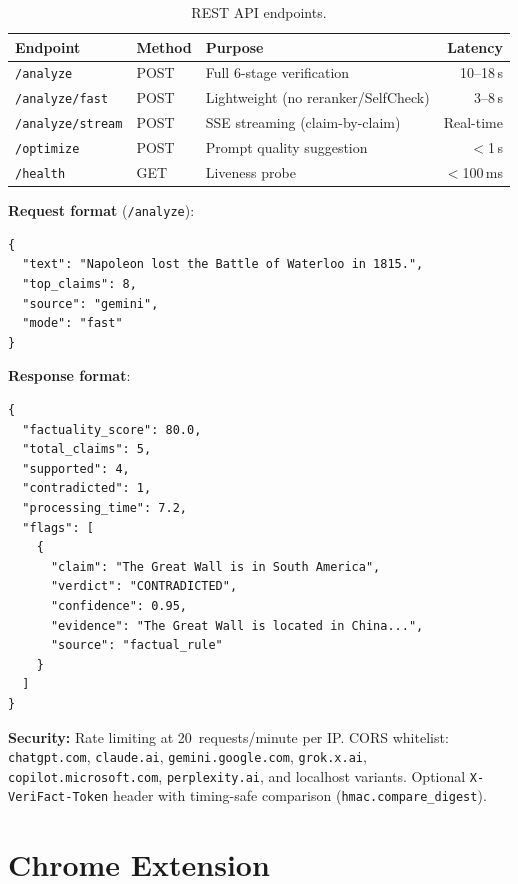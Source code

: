 \documentclass[12pt, a4paper, oneside]{report}
\begin{document}
\begin{table}[H]
\centering
\caption{REST API endpoints.}
\label{tab:api}
\small
\begin{tabularx}{\textwidth}{l l X r}
\toprule
\textbf{Endpoint} & \textbf{Method} & \textbf{Purpose} & \textbf{Latency} \\
\midrule
\texttt{/analyze} & POST & Full 6-stage verification & 10--18\,s \\
\texttt{/analyze/fast} & POST & Lightweight (no reranker/SelfCheck) & 3--8\,s \\
\texttt{/analyze/stream} & POST & SSE streaming (claim-by-claim) & Real-time \\
\texttt{/optimize} & POST & Prompt quality suggestion & $<$1\,s \\
\texttt{/health} & GET & Liveness probe & $<$100\,ms \\
\bottomrule
\end{tabularx}
\end{table}

\textbf{Request format} (\texttt{/analyze}):
\begin{lstlisting}[style=jsonstyle, caption={POST /analyze request body.}]
{
  "text": "Napoleon lost the Battle of Waterloo in 1815.",
  "top_claims": 8,
  "source": "gemini",
  "mode": "fast"
}
\end{lstlisting}

\textbf{Response format}:
\begin{lstlisting}[style=jsonstyle, caption={POST /analyze response body.}]
{
  "factuality_score": 80.0,
  "total_claims": 5,
  "supported": 4,
  "contradicted": 1,
  "processing_time": 7.2,
  "flags": [
    {
      "claim": "The Great Wall is in South America",
      "verdict": "CONTRADICTED",
      "confidence": 0.95,
      "evidence": "The Great Wall is located in China...",
      "source": "factual_rule"
    }
  ]
}
\end{lstlisting}

\textbf{Security:} Rate limiting at 20~requests/minute per IP. CORS whitelist: \texttt{chatgpt.com}, \texttt{claude.ai}, \texttt{gemini.google.com}, \texttt{grok.x.ai}, \texttt{copilot.microsoft.com}, \texttt{perplexity.ai}, and localhost variants. Optional \texttt{X-VeriFact-Token} header with timing-safe comparison (\texttt{hmac.compare\_digest}).

\section{Chrome Extension}
\end{document}
